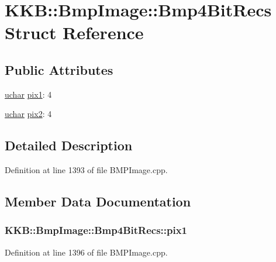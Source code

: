 \hypertarget{struct_bmp_image_1_1_bmp4_bit_recs}{}\section{K\+KB\+:\+:Bmp\+Image\+:\+:Bmp4\+Bit\+Recs Struct Reference}
\label{struct_bmp_image_1_1_bmp4_bit_recs}
\subsection*{Public Attributes}
\begin{DoxyCompactItemize}
\item 
\hyperlink{namespace_k_k_b_ace9969169bf514f9ee6185186949cdf7}{uchar} \hyperlink{struct_bmp_image_1_1_bmp4_bit_recs_ade9c50af24ff21c2958f58df568ec6f5}{pix1}\+: 4
\item 
\hyperlink{namespace_k_k_b_ace9969169bf514f9ee6185186949cdf7}{uchar} \hyperlink{struct_bmp_image_1_1_bmp4_bit_recs_a45bbfafb3159533bb2322a4eebe265de}{pix2}\+: 4
\end{DoxyCompactItemize}


\subsection{Detailed Description}


Definition at line 1393 of file B\+M\+P\+Image.\+cpp.



\subsection{Member Data Documentation}
\subsubsection[{\texorpdfstring{pix1}{pix1}}]{ K\+K\+B\+::\+Bmp\+Image\+::\+Bmp4\+Bit\+Recs\+::pix1}\hypertarget{struct_bmp_image_1_1_bmp4_bit_recs_ade9c50af24ff21c2958f58df568ec6f5}{}\label{struct_bmp_image_1_1_bmp4_bit_recs_ade9c50af24ff21c2958f58df568ec6f5}


Definition at line 1396 of file B\+M\+P\+Image.\+cpp.

